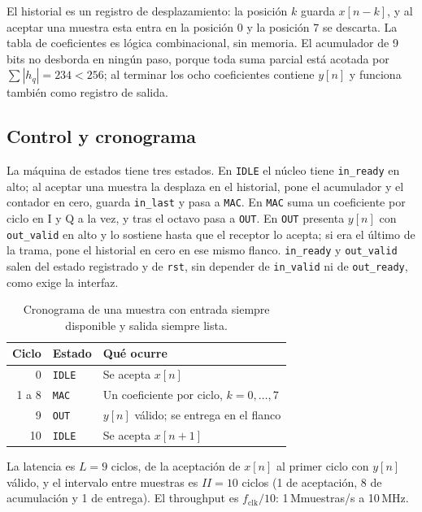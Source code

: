 El historial es un registro de desplazamiento: la posición $k$ guarda $x[n-k]$, y al aceptar una muestra esta entra en la posición 0 y la posición 7 se descarta. La tabla de coeficientes es lógica combinacional, sin memoria. El acumulador de 9 bits no desborda en ningún paso, porque toda suma parcial está acotada por $\sum|h_q| = 234 < 256$; al terminar los ocho coeficientes contiene $y[n]$ y funciona también como registro de salida.

\subsection{Control y cronograma}

La máquina de estados tiene tres estados. En \texttt{IDLE} el núcleo tiene \texttt{in\_ready} en alto; al aceptar una muestra la desplaza en el historial, pone el acumulador y el contador en cero, guarda \texttt{in\_last} y pasa a \texttt{MAC}. En \texttt{MAC} suma un coeficiente por ciclo en I y Q a la vez, y tras el octavo pasa a \texttt{OUT}. En \texttt{OUT} presenta $y[n]$ con \texttt{out\_valid} en alto y lo sostiene hasta que el receptor lo acepta; si era el último de la trama, pone el historial en cero en ese mismo flanco. \texttt{in\_ready} y \texttt{out\_valid} salen del estado registrado y de \texttt{rst}, sin depender de \texttt{in\_valid} ni de \texttt{out\_ready}, como exige la interfaz.

\begin{table}[h]
  \centering
  \caption{Cronograma de una muestra con entrada siempre disponible y salida siempre lista.}\label{tab:tiempo-ciclos}
  \begin{tabular}{rll}
    \toprule
    Ciclo & Estado & Qué ocurre \\
    \midrule
    0 & \texttt{IDLE} & Se acepta $x[n]$ \\
    1 a 8 & \texttt{MAC} & Un coeficiente por ciclo, $k = 0, \dots, 7$ \\
    9 & \texttt{OUT} & $y[n]$ válido; se entrega en el flanco \\
    10 & \texttt{IDLE} & Se acepta $x[n+1]$ \\
    \bottomrule
  \end{tabular}
\end{table}

La latencia es $L = 9$ ciclos, de la aceptación de $x[n]$ al primer ciclo con $y[n]$ válido, y el intervalo entre muestras es $II = 10$ ciclos (1 de aceptación, 8 de acumulación y 1 de entrega). El throughput es $f_\text{clk}/10$: 1\,Mmuestras/s a 10\,MHz.

